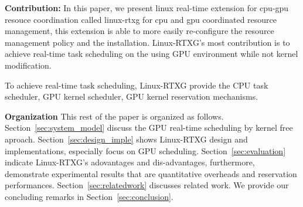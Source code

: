 \textbf{Contribution:}
In this paper, we present linux real-time extension for cpu-gpu resouce coordination called linux-rtxg for cpu and gpu coordinated resource management, this extension is able to more easily re-configure the resource management policy and the installation.
Linux-RTXG's most contribution is to achieve real-time task scheduling on the using GPU environment while not kernel modification.

To achieve real-time task scheduling, 
Linux-RTXG provide the CPU task scheduler, GPU kernel scheduler, GPU kernel reservation mechanisms.

\textbf{Organization}
This rest of the paper is organized as follows.
Section~\ref{sec:system_model} discuss the GPU real-time scheduling by kernel free aproach.
Section~\ref{sec:design_imple} shows Linux-RTXG design and implementations, especially focus on GPU scheduling.
Section~\ref{sec:evaluation} indicate Linux-RTXG's adovantages and dis-advantages,
furthermore, demonstrate experimental results that are quantitative overheads and reservation performances.
Section~\ref{sec:relatedwork} discusses related work.
We provide our concluding remarks in Section~\ref{sec:conclusion}.

